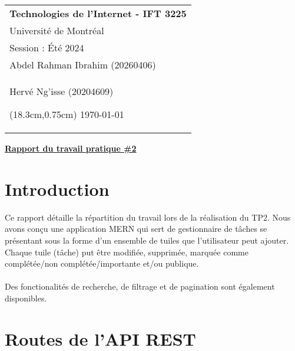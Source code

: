 \documentclass[a4paper,12pt]{article}
\begin{document}
\thispagestyle{empty}

\begin{tabular}{p{15.5cm}}
{\large \bf Technologies de l'Internet - IFT 3225}\\
Université de Montréal \\ Session : Été 2024\\ Abdel Rahman Ibrahim (20260406) \\ Hervé Ng'isse (20204609)




\begin{textblock*}{5cm}(18.3cm,0.75cm)
   \today
\end{textblock*} \\
\hline
\end{tabular}

\vspace*{0.3cm}

\begin{center}
	{\Large \bf \underline{Rapport du travail pratique \#2}}
	\vspace{1mm}
\end{center}  

\section{Introduction}


Ce rapport détaille la répartition du travail lors de la réalisation du TP2.
Nous avons conçu une application MERN qui sert de gestionnaire de tâches 
se présentant sous la forme d'un ensemble de tuiles que l'utilisateur peut ajouter.
Chaque tuile (tâche) put être modifiée, supprimée, marquée 
comme complétée/non complétée/importante et/ou publique. 
\\ \\
Des fonctionalités de recherche, de filtrage et de pagination sont également disponibles.


\section{Routes de l'API REST}
\end{document}
